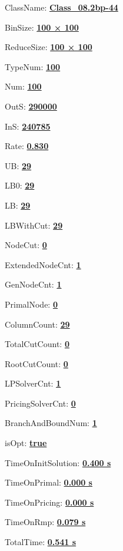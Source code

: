 \documentclass[11pt]{article}
\begin{document}
\pagestyle{empty}


ClassName: \underline{\textbf{Class_08.2bp-44}}
\par
BinSize: \underline{\textbf{100 × 100}}
\par
ReduceSize: \underline{\textbf{100 × 100}}
\par
TypeNum: \underline{\textbf{100}}
\par
Num: \underline{\textbf{100}}
\par
OutS: \underline{\textbf{290000}}
\par
InS: \underline{\textbf{240785}}
\par
Rate: \underline{\textbf{0.830}}
\par
UB: \underline{\textbf{29}}
\par
LB0: \underline{\textbf{29}}
\par
LB: \underline{\textbf{29}}
\par
LBWithCut: \underline{\textbf{29}}
\par
NodeCut: \underline{\textbf{0}}
\par
ExtendedNodeCnt: \underline{\textbf{1}}
\par
GenNodeCnt: \underline{\textbf{1}}
\par
PrimalNode: \underline{\textbf{0}}
\par
ColumnCount: \underline{\textbf{29}}
\par
TotalCutCount: \underline{\textbf{0}}
\par
RootCutCount: \underline{\textbf{0}}
\par
LPSolverCnt: \underline{\textbf{1}}
\par
PricingSolverCnt: \underline{\textbf{0}}
\par
BranchAndBoundNum: \underline{\textbf{1}}
\par
isOpt: \underline{\textbf{true}}
\par
TimeOnInitSolution: \underline{\textbf{0.400 s}}
\par
TimeOnPrimal: \underline{\textbf{0.000 s}}
\par
TimeOnPricing: \underline{\textbf{0.000 s}}
\par
TimeOnRmp: \underline{\textbf{0.079 s}}
\par
TotalTime: \underline{\textbf{0.541 s}}
\par
\newpage


\end{document}
